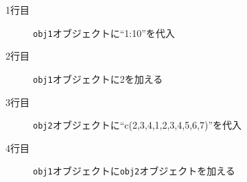 \begin{description}
	\item[1行目] \texttt{obj1}オブジェクトに``1:10''を代入
	\item[2行目] \texttt{obj1}オブジェクトに2を加える
	\item[3行目] \texttt{obj2}オブジェクトに``c(2,3,4,1,2,3,4,5,6,7)''を代入
	\item[4行目] \texttt{obj1}オブジェクトに\texttt{obj2}オブジェクトを加える
\end{description}
